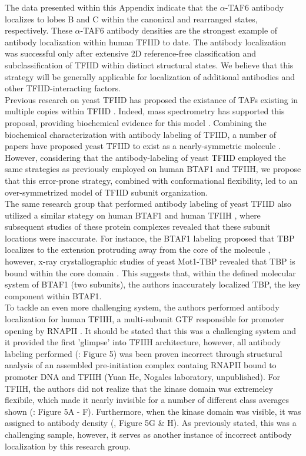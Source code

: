 The data presented within this Appendix indicate that the $\alpha$-TAF6 antibody localizes to lobes B and C within the canonical and rearranged states, respectively. These $\alpha$-TAF6 antibody densities are the strongest example of antibody localization within human TFIID to date. The antibody localization was successful only after extensive 2D reference-free classification and subclassification of TFIID within distinct structural states. We believe that this strategy will be generally applicable for localization of additional antibodies and other TFIID-interacting factors.\\
\indent Previous research on yeast TFIID has proposed the existance of TAFs existing in multiple copies within TFIID \cite{Leurent_1554,Leurent_1797}. Indeed, mass spectrometry has supported this proposal, providing biochemical evidence for this model \cite{Sanders_2002}. Combining the biochemical characterization with antibody labeling of TFIID, a number of papers have proposed yeast TFIID to exist as a nearly-symmetric molecule \cite{Leurent_1554,Papai_191}. However, considering that the antibody-labeling of yeast TFIID employed the same strategies as previously employed on human BTAF1 and TFIIH, we propose that this error-prone strategy, combined with conformational flexibility, led to an over-symmetrized model of TFIID subunit organization.\\
\indent The same research group that performed antibody labeling of yeast TFIID also utilized a similar stategy on human BTAF1 \cite{Pereira_2004} and human TFIIH \cite{Schultz_2000}, where subsequent studies of these protein complexes revealed that these subunit locations were inaccurate. For instance, the BTAF1 labeling proposed that TBP localizes to the extension protruding away from the core of the molecule \cite{Pereira_2004}, however, x-ray crystallographic studies of yeast Mot1-TBP revealed that TBP is bound within the core domain \cite{Pereira_2004}. This suggests that, within the defined molecular system of BTAF1 (two subunits), the authors inaccurately localized TBP, the key component within BTAF1. \\
\indent To tackle an even more challenging system, the authors performed antibody localization for human TFIIH, a multi-subunit GTF responsible for promoter opening by RNAPII \cite{Schultz_2000}. It should be stated that this was a challenging system and it provided the first 'glimpse' into TFIIH architecture, however, all antibody labeling performed (\cite{Schultz_2000}: Figure 5) was been proven incorrect through structural analysis of an assembled pre-initiation complex containg  RNAPII bound to promoter DNA and TFIIH (Yuan He, Nogales laboratory, unpublished). For TFIIH, the authors did not realize that the kinase domain was extremeley flexibile, which made it nearly invisible for a number of different class averages shown (\cite{Schultz_2000}: Figure 5A - F). Furthermore, when the kinase domain was visible, it was assigned to antibody density (\cite{Schultz_2000}, Figure 5G \& H). As previously stated, this was a challenging sample, however, it serves as another instance of incorrect antibody localization by this research group.\\
